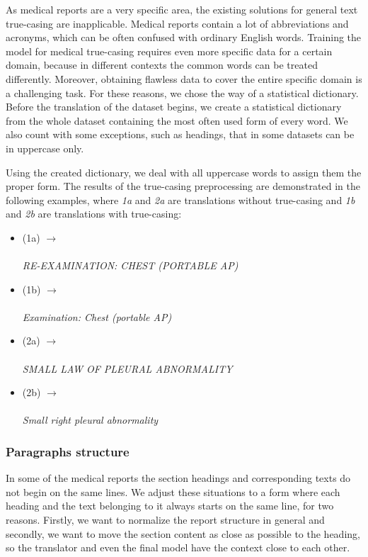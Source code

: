As medical reports are a very specific area, the existing solutions for general text true-casing are inapplicable. Medical reports contain a lot of abbreviations and acronyms, which can be often confused with ordinary English words. Training the model for medical true-casing requires even more specific data for a certain domain, because in different contexts the common words can be treated differently. Moreover, obtaining flawless data to cover the entire specific domain is a challenging task. For these reasons, we chose the way of a statistical dictionary. Before the translation of the dataset begins, we create a statistical dictionary from the whole dataset containing the most often used form of every word. We also count with some exceptions, such as headings, that in some datasets can be in uppercase only.\\
\newpage

Using the created dictionary, we deal with all uppercase words to assign them the proper form. The results of the true-casing preprocessing are demonstrated in the following examples, where \textit{1a} and \textit{2a} are translations without true-casing and \textit{1b} and \textit{2b} are translations with true-casing:
\begin{itemize}
	\item (1a)  $\rightarrow$ \\ \phantom{(1a)}  \\ \phantom{(1a)} \textit{RE-EXAMINATION: CHEST (PORTABLE AP)}
	\item (1b)  $\rightarrow$ \\ \phantom{(1b)}  \\ \phantom{(1b)} \textit{Examination: Chest (portable AP)}
	\item (2a)  $\rightarrow$ \\ \phantom{(2a)}  \\ \phantom{(2a)} \textit{SMALL LAW OF PLEURAL ABNORMALITY}
	\item (2b)  $\rightarrow$ \\ \phantom{(2b)}  \\ \phantom{(2b)} \textit{Small right pleural abnormality}
\end{itemize}

\subsubsection*{Paragraphs structure}
In some of the medical reports the section headings and corresponding texts do not begin on the same lines. We adjust these situations to a form where each heading and the text belonging to it always starts on the same line, for two reasons. Firstly, we want to normalize the report structure in general and secondly, we want to move the section content as close as possible to the heading, so the translator and even the final model have the context close to each other.

